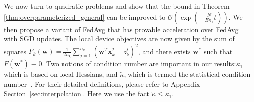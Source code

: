 We now turn to quadratic problems and show that the bound in Theorem \ref{thm:overparameterized_general} can be improved to $\mathcal{O}(\exp(-\frac{N}{E\kappa_{1}}t))$. We then propose a variant of FedAvg that has provable acceleration over FedAvg with SGD updates. The local device objectives are now given by the sum of squares {\small$F_{k}(\mathbf{w})=\frac{1}{2n_{k}}\sum_{j=1}^{n_{k}}(\mathbf{w}^{T}\mathbf{x}_{k}^{j}-z_{k}^{j})^{2}$},
and there exists $\mathbf{w}^{\ast}$ such that $F(\mathbf{w}^{\ast})\equiv0$. Two notions of condition number are important in our results:$\kappa_1$ which is based on local Hessians, and $\tilde{\kappa}$, which is termed the statistical condition number~\cite{liu2018accelerating,jain2017accelerating}. For their detailed definitions, please refer to Appendix Section~\ref{sec:interpolation}. Here we use the fact $\tilde{\kappa} \leq \kappa_1$.

\begin{comment}
Define the local Hessian matrix as $H^{k}:=\frac{1}{n_{k}}\sum_{j=1}^{n_{k}}\mathbf{x}_{k}^{j}(\mathbf{x}_{k}^{j})^{T}$, and the stochastic Hessian matrix as $\tilde{H}_{t}^{k}:=\xi_{t}^{k}(\xi_{t}^{k})^{T}$. Define $l$ to be the smallest positive number such that $\mathbb{E}\|\xi_{t}^{k}\|^{2}$$\mathbf{\xi}_{t}^{k}$($\mathbf{\xi}_{t}^{k})^{T}\preceq lH^{k}$
for all $k$. Note that $l\leq\max_{k,j}\|\mathbf{x}_{k}^{j}\|^{2}$.
Let $L$ and $\mu$ be lower and upper bounds of non-zero eigenvalues
of $H^{k}$. Define $\kappa_{1}:=l/\mu$ and $\kappa:=L/\mu$. Following
\cite{liu2018accelerating,jain2017accelerating}, we define the statistical
condition number $\tilde{\kappa}$ as the smallest positive real number
such that $\mathbb{E}\left[\langle\xi_{t}^{k}(H^{k})^{-1},\xi_{t}^{k}\rangle\xi_{t}^{k}(\xi_{t}^{k})^{T}\right] \  \preceq\tilde{\kappa}H^{k}$, for all $k$. 
The condition numbers $\kappa_{1}$ and $\tilde{\kappa}$
are important in the characterization of convergence rates for FedAvg
algorithms. Note that $\kappa_{1}>\kappa$ and $\kappa_{1}>\tilde{\kappa}$.
\end{comment}

